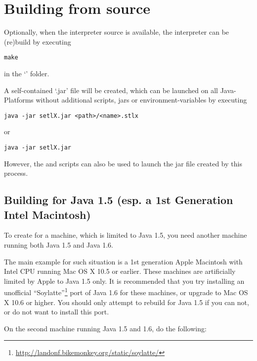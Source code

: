 \section{Building from source}

Optionally, when the interpreter source is available, the interpreter can be (re)build by executing

\begin{lstlisting}[frame=none,numbers=none]
make
\end{lstlisting}

in the `' folder.

A self-contained `.jar' file will be created, which can be launched on all Java-Platforms without additional scripts, jars or environment-variables by executing

\begin{lstlisting}[frame=none,numbers=none]
java -jar setlX.jar <path>/<name>.stlx
\end{lstlisting}

or

\begin{lstlisting}[frame=none,numbers=none]
java -jar setlX.jar
\end{lstlisting}

However, the  and  scripts can also be used to launch the jar file created by this process.

\subsection{Building for Java 1.5 (esp. a 1st Generation Intel Macintosh)}\label{MACj5}

To create \setlX{} for a machine, which is limited to Java 1.5, you need another machine running both Java 1.5 and Java 1.6.

The main example for such situation is a 1st generation Apple Macintosh with Intel CPU running Mac OS X 10.5 or earlier. These machines are artificially limited by Apple to Java 1.5 only. It is recommended that you try installing an unofficial ``Soylatte''\footnote{\url{http://landonf.bikemonkey.org/static/soylatte/}} port of Java 1.6 for these machines, or upgrade to Mac OS X 10.6 or higher. You should only attempt to rebuild \setlX{} for Java 1.5 if you can not, or do not want to install this port.

On the second machine running Java 1.5 and 1.6, do the following:

